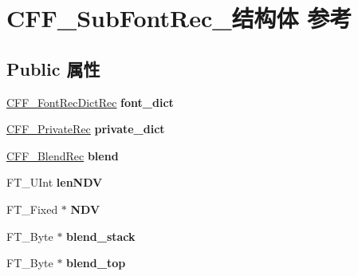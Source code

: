 \hypertarget{struct_c_f_f___sub_font_rec__}{}\section{C\+F\+F\+\_\+\+Sub\+Font\+Rec\+\_\+结构体 参考}
\label{struct_c_f_f___sub_font_rec__}
\subsection*{Public 属性}
\begin{DoxyCompactItemize}
\item 
\mbox{\label{struct_c_f_f___sub_font_rec___af23b698ce981c661db031c834475ddb2}} 
\hyperlink{struct_c_f_f___font_rec_dict_rec__}{C\+F\+F\+\_\+\+Font\+Rec\+Dict\+Rec} {\bfseries font\+\_\+dict}
\item 
\mbox{\label{struct_c_f_f___sub_font_rec___abdfa5a7b7bf4e40ca1ddef7decaae281}} 
\hyperlink{struct_c_f_f___private_rec__}{C\+F\+F\+\_\+\+Private\+Rec} {\bfseries private\+\_\+dict}
\item 
\mbox{\label{struct_c_f_f___sub_font_rec___ae52300c5253707599a212a48ab69390f}} 
\hyperlink{struct_c_f_f___blend_rec__}{C\+F\+F\+\_\+\+Blend\+Rec} {\bfseries blend}
\item 
\mbox{\label{struct_c_f_f___sub_font_rec___a1d13bb728608a535eec914a26d74ed06}} 
F\+T\+\_\+\+U\+Int {\bfseries len\+N\+DV}
\item 
\mbox{\label{struct_c_f_f___sub_font_rec___a0149e0a8099582fa12804e87c40a7123}} 
F\+T\+\_\+\+Fixed $\ast$ {\bfseries N\+DV}
\item 
\mbox{\label{struct_c_f_f___sub_font_rec___a70ae4125ea387e9ee5f61908c3418f7d}} 
F\+T\+\_\+\+Byte $\ast$ {\bfseries blend\+\_\+stack}
\item 
\mbox{\label{struct_c_f_f___sub_font_rec___a69ac6da5a344ba53dedd0927dbd67fb1}} 
F\+T\+\_\+\+Byte $\ast$ {\bfseries blend\+\_\+top}
\item 
\mbox{\label{struct_c_f_f___sub_font_rec___a87a7db8390b4f98e9d0be742847c48fb}} 

\end{DoxyCompactItemize}
